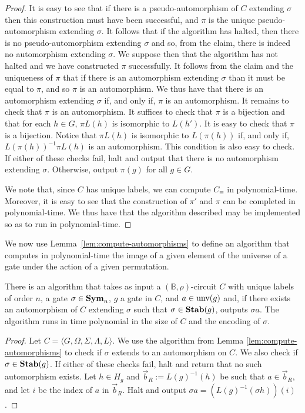 \documentclass[../main/thesis.tex]{subfiles}
\begin{document}
\begin{proof}
It is easy to see that if there is a pseudo-automorphism of $C$ extending
$\sigma$ then this construction must have been successful, and $\pi$ is the
unique pseudo-automorphism extending $\sigma$. It follows that if the algorithm
has halted, then there is no pseudo-automorphism extending $\sigma$ and so, from
the claim, there is indeed no automorphism extending $\sigma$. We suppose then
that the algorithm has not halted and we have constructed $\pi$ successfully. It
follows from the claim and the uniqueness of $\pi$ that if there is an
automorphism extending $\sigma$ than it must be equal to $\pi$, and so $\pi$ is
an automorphism. We thus have that there is an automorphism extending $\sigma$
if, and only if, $\pi$ is an automorphism. It remains to check that $\pi$ is an
automorphism. It suffices to check that $\pi$ is a bijection and that for each
$h \in G$, $\pi L(h)$ is isomorphic to $L(h')$. It is easy to check that $\pi$
is a bijection. Notice that $\pi L(h)$ is isomorphic to $L(\pi(h))$ if, and only
if, $L(\pi(h))^{-1}\pi L(h)$ is an automorphism. This condition is also easy to
check. If either of these checks fail, halt and output that there is no
automorphism extending $\sigma$. Otherwise, output $\pi (g)$ for all $g \in G$.

We note that, since $C$ has unique labels, we can compute $C_\equiv$ in
polynomial-time. Moreover, it is easy to see that the construction of $\pi'$ and
$\pi$ can be completed in polynomial-time. We thus have that the algorithm
described may be implemented so as to run in polynomial-time.
\end{proof}

We now use Lemma~\ref{lem:compute-automorphisms} to define an algorithm that
computes in polynomial-time the image of a given element of the universe of a
gate under the action of a given permutation.

\begin{lem}
  There is an algorithm that takes as input a $(\mathbb{B}, \rho)$-circuit $C$
  with unique labels of order $n$, a gate $\sigma \in \text{\textbf{Sym}}_n$, $g$ a gate in
  $C$, and $a \in \text{unv}(g)$ and, if there exists an automorphism of $C$
  extending $\sigma$ such that $\sigma \in \text{\textbf{Stab}}(g)$, outputs $\sigma a$. The
  algorithm runs in time polynomial in the size of $C$ and the encoding of
  $\sigma$.
  \label{lem:compute-automorphisms-labels}
\end{lem}
\begin{proof}
  Let $C = \langle G, \Omega, \Sigma, \Lambda, L \rangle$. We use the algorithm
  from Lemma \ref{lem:compute-automorphisms} to check if $\sigma$ extends to an
  automorphism on $C$. We also check if $\sigma \in \text{\textbf{Stab}}(g)$. If either of
  these checks fail, halt and return that no such automorphism exists. Let $h
  \in H_g$ and $\vec{b}_R := L(g)^{-1}(h)$ be such that $a \in \vec{b}_R$, and
  let $i$ be the index of $a$ in $\vec{b}_R$. Halt and output $\sigma a =
  (L(g)^{-1}(\sigma h))(i)$.
\end{proof}
\end{document}
